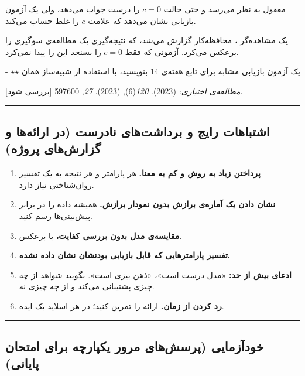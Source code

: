 معقول به نظر می‌رسد و حتی حالت \(c = 0\) را درست جواب می‌دهد، ولی یک آزمون
بازیابی نشان می‌دهد که علامت \(c\) را غلط حساب می‌کند.

یک مشاهده‌گر ، محافظه‌کار گزارش می‌شد، که نتیجه‌گیری یک مطالعه‌ی
سوگیری را برعکس می‌کرد. آزمونی که فقط \(c = 0\) را بسنجد این را پیدا
نمی‌کرد.

- \ensuremath{\star}\ensuremath{\star} یک آزمون بازیابی مشابه برای تابع  هفته‌ی 14
بنویسید، با استفاده از شبیه‌ساز همان 

\emph{مطالعه‌ی اختیاری:}  \lr{\&}  (2023).
 \emph{
120}(6),  \lr{\&}  (2023). 
\emph{ 27}, 597\lr{--}600 {[}بررسی شود{]}.

\begin{center}\rule{0.5\linewidth}{0.5pt}\end{center}

\subsection{اشتباهات رایج و برداشت‌های نادرست (در ارائه‌ها و گزارش‌های
پروژه)}

\begin{enumerate}
\def\labelenumi{\arabic{enumi}.}
\tightlist
\item
  \textbf{پرداختن زیاد به روش و کم به معنا.} هر پارامتر و هر نتیجه به یک
  تفسیر روان‌شناختی نیاز دارد.
\item
  \textbf{نشان دادن یک آماره‌ی برازش بدون نمودار برازش.} همیشه داده را در
  برابر پیش‌بینی‌ها رسم کنید.
\item
  \textbf{مقایسه‌ی مدل بدون بررسی کفایت،} یا برعکس.
\item
  \textbf{تفسیر پارامترهایی که قابل بازیابی بودنشان نشان داده نشده.}
\item
  \textbf{ادعای بیش از حد:} «مدل درست است»، «ذهن بیزی است». بگویید شواهد
  از چه چیزی پشتیبانی می‌کند و از چه چیزی نه.
\item
  \textbf{رد کردن از زمان.} ارائه را تمرین کنید؛ در هر اسلاید یک ایده.
\end{enumerate}

\begin{center}\rule{0.5\linewidth}{0.5pt}\end{center}

\subsection{خودآزمایی (پرسش‌های مرور یکپارچه برای امتحان پایانی)}

